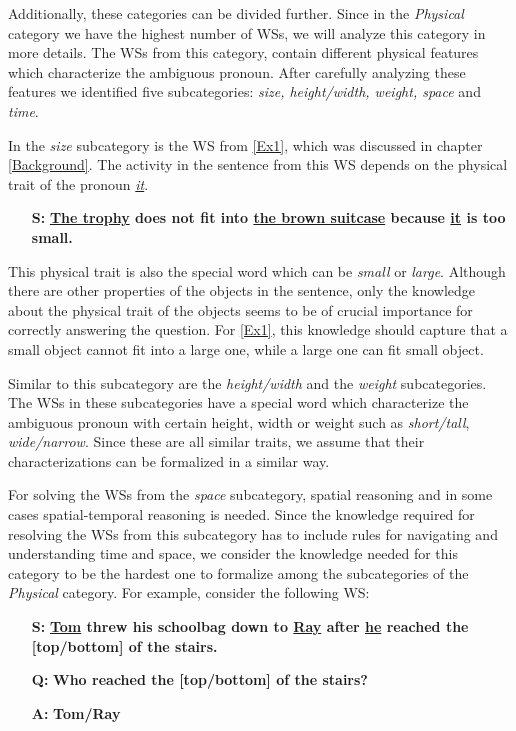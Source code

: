 Additionally, these categories can be divided further.
Since in the \textit{Physical} category we have the highest number of WSs, we will analyze this category in more details. The WSs from this category, contain different physical features which characterize the ambiguous pronoun. After carefully analyzing these features we identified five subcategories: \textit{size, height/width, weight, space} and \textit{time}. 

In the \textit{size} subcategory is the WS from \ref{Ex1}, which was discussed in chapter \ref{Background}.
The activity in the sentence from this WS depends on the physical trait of the pronoun \textit{\underline{it}}.
\begin{itemize}
	\item[\textbf{S:}] \textbf{\underline{The trophy} does not fit into \underline{the brown suitcase} because \underline{it} is too small.}
\end{itemize}
This physical trait is also the special word which can be \textit{small} or \textit{large}. Although there are other properties of the objects in the sentence, only the knowledge about the physical trait of the objects seems to be of crucial importance for correctly answering the question. 
For \ref{Ex1}, this knowledge should capture that a small object cannot fit into a large one, while a large one can fit small object.

Similar to this subcategory are the \textit{height/width} and the \textit{weight} subcategories. The WSs in these subcategories have a special word which characterize the ambiguous pronoun with certain height, width or weight such as \textit{short/tall}, \textit{wide/narrow}. Since these are all similar traits, we assume that their characterizations can be formalized in a similar way.


For solving the WSs from the \textit{space} subcategory, spatial reasoning and in some cases spatial-temporal reasoning is needed. Since the knowledge required for resolving the WSs from this subcategory has to include rules for navigating and understanding time and space, we consider the knowledge needed for this category to be the hardest one to formalize among the subcategories of the \textit{Physical} category.
For example, consider the following WS:\\
\begin{itemize} 
	\item[\textbf{S:}] \textbf{\underline{Tom} threw his schoolbag down to \underline{Ray} after \underline{he} reached the [top/bottom] of the stairs.}
	\item[\textbf{Q:}] \textbf{Who reached the [top/bottom] of the stairs?}
	\item[\textbf{A:}] \textbf{Tom/Ray}
\end{itemize}

